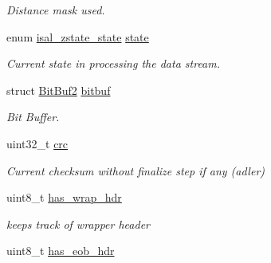 \begin{DoxyCompactItemize}
\begin{DoxyCompactList}\small\item\em Distance mask used. \end{DoxyCompactList}\item 
\hypertarget{structisal__zstate_a972dd54176275b6ca03ebd82a9e104c6}{enum \hyperlink{igzip__lib_8h_a15a192d6ccce5232a81e04a89e546025}{isal\-\_\-zstate\-\_\-state} \hyperlink{structisal__zstate_a972dd54176275b6ca03ebd82a9e104c6}{state}}\label{structisal__zstate_a972dd54176275b6ca03ebd82a9e104c6}

\begin{DoxyCompactList}\small\item\em Current state in processing the data stream. \end{DoxyCompactList}\item 
\hypertarget{structisal__zstate_a6ac389906a92107b440b74ac8d9ccd7b}{struct \hyperlink{structBitBuf2}{Bit\-Buf2} \hyperlink{structisal__zstate_a6ac389906a92107b440b74ac8d9ccd7b}{bitbuf}}\label{structisal__zstate_a6ac389906a92107b440b74ac8d9ccd7b}

\begin{DoxyCompactList}\small\item\em Bit Buffer. \end{DoxyCompactList}\item 
\hypertarget{structisal__zstate_a8508929f6b193987f05fb4fbee69bffe}{uint32\-\_\-t \hyperlink{structisal__zstate_a8508929f6b193987f05fb4fbee69bffe}{crc}}\label{structisal__zstate_a8508929f6b193987f05fb4fbee69bffe}

\begin{DoxyCompactList}\small\item\em Current checksum without finalize step if any (adler) \end{DoxyCompactList}\item 
\hypertarget{structisal__zstate_adb81b0703b0f1c4c9516b9f02cae8595}{uint8\-\_\-t \hyperlink{structisal__zstate_adb81b0703b0f1c4c9516b9f02cae8595}{has\-\_\-wrap\-\_\-hdr}}\label{structisal__zstate_adb81b0703b0f1c4c9516b9f02cae8595}

\begin{DoxyCompactList}\small\item\em keeps track of wrapper header \end{DoxyCompactList}\item 
\hypertarget{structisal__zstate_a01941715df42c4ca8cd449f5a4e98ae3}{uint8\-\_\-t \hyperlink{structisal__zstate_a01941715df42c4ca8cd449f5a4e98ae3}{has\-\_\-eob\-\_\-hdr}}\label{structisal__zstate_a01941715df42c4ca8cd449f5a4e98ae3}


\end{DoxyCompactItemize}
